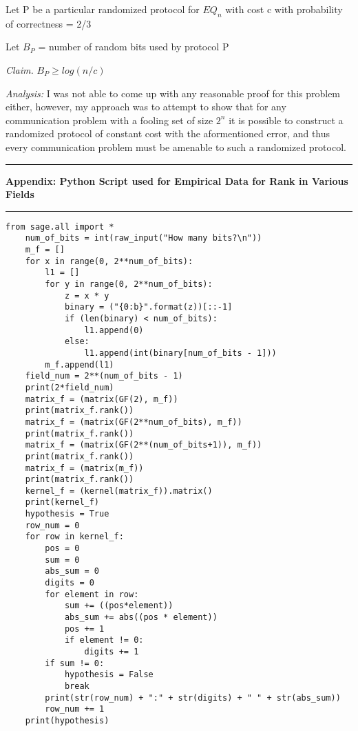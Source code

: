 \documentclass[11pt]{article}
\newcommand\newAppendix[2]{\vspace{.25in}\hrule\textbf{#1 #2}\vspace{.5em}\hrule\vspace{.10in}}
\newcommand\analysis{\vspace{.10in}\emph{Analysis: }\newline}
\newcommand\claim{\emph{Claim.}\newline}
\begin{document}
Let P be a particular randomized protocol for $EQ_n$ with cost c with probability of correctness = 2/3

Let $B_P$ = number of random bits used by protocol P 

\claim
$B_{P} \geq log(n/c)$

\analysis
I was not able to come up with any reasonable proof for this problem either, however, my approach was to attempt to show that for any communication problem with a fooling set of size $2^n$ it is possible to construct a randomized protocol of constant cost with the aformentioned error, and thus every communication problem must be amenable to such a randomized protocol. 

\newpage
\newAppendix{Appendix:}{Python Script used for Empirical Data for Rank in Various Fields}
\begin{lstlisting}
from sage.all import *
    num_of_bits = int(raw_input("How many bits?\n"))
    m_f = []
    for x in range(0, 2**num_of_bits):
        l1 = []
        for y in range(0, 2**num_of_bits):
            z = x * y
            binary = ("{0:b}".format(z))[::-1]
            if (len(binary) < num_of_bits):
                l1.append(0)
            else:
                l1.append(int(binary[num_of_bits - 1]))
        m_f.append(l1)
    field_num = 2**(num_of_bits - 1)
    print(2*field_num)
    matrix_f = (matrix(GF(2), m_f))
    print(matrix_f.rank())
    matrix_f = (matrix(GF(2**num_of_bits), m_f))
    print(matrix_f.rank()) 
    matrix_f = (matrix(GF(2**(num_of_bits+1)), m_f))
    print(matrix_f.rank())
    matrix_f = (matrix(m_f))
    print(matrix_f.rank())
    kernel_f = (kernel(matrix_f)).matrix()
    print(kernel_f)
    hypothesis = True
    row_num = 0
    for row in kernel_f:
        pos = 0
        sum = 0
        abs_sum = 0
        digits = 0
        for element in row:
            sum += ((pos*element))
            abs_sum += abs((pos * element))
            pos += 1
            if element != 0:
                digits += 1
        if sum != 0:
            hypothesis = False
            break
        print(str(row_num) + ":" + str(digits) + " " + str(abs_sum))
        row_num += 1
    print(hypothesis) 
       
\end{lstlisting}
\end{document}
